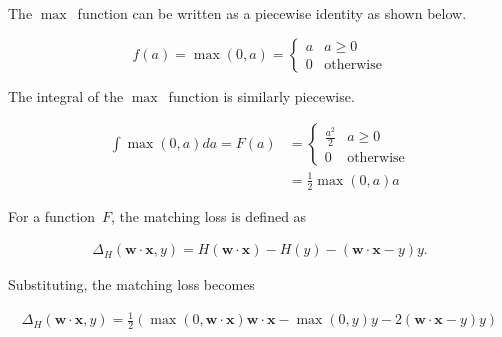 \documentclass{report}
\newcommand{\w}{\mathbf{w}}
\newcommand{\xvec}{\mathbf{x}}
\newcommand{\wx}{\w\cdot\xvec}
\begin{document}
  The $\max$~function can be written as a piecewise identity as shown below.
  
  \begin{equation}
    f(a) = \max(0,a)= \left\{
                        \begin{array}{ll}
                          a & a \geq 0\\
                          0 & \text{otherwise}
                        \end{array}
                      \right.
  \end{equation}
 
  \noindent
  The integral of the $\max$~function is similarly piecewise.

  \begin{align}
     \int \max(0,a) da = F(a) &=  \left\{
                                    \begin{array}{cl}
                                      \frac{a^2}{2} & a \geq 0\\
                                      0 & \text{otherwise}
                                    \end{array}
                                  \right.\\
                              &=  \frac{1}{2}\max(0,a)a
  \end{align}

  For a function~$F$, the matching loss is defined as
  
  \begin{align}
    \Delta_{H}(\wx, y) = H(\wx) - H(y) - (\wx - y)y\textrm{.}
  \end{align}

  Substituting, the matching loss becomes
  
  \begin{align}
    \boxed{\Delta_{H}(\wx, y) = \frac{1}{2}\left( \max(0,\wx)\wx - \max(0,y)y - 2(\wx -y)y \right)}
  \end{align}
\end{document}
